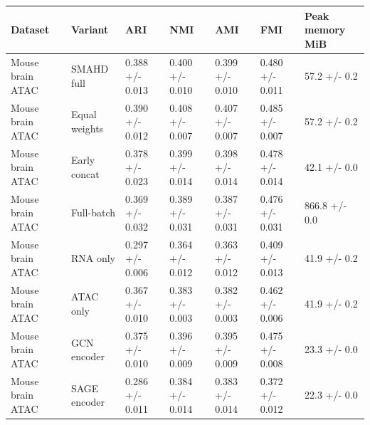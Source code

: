 \begin{tabular}{lllllll}
\toprule
Dataset & Variant & ARI & NMI & AMI & FMI & Peak memory MiB \\
\midrule
Mouse brain ATAC & SMAHD full & 0.388 +/- 0.013 & 0.400 +/- 0.010 & 0.399 +/- 0.010 & 0.480 +/- 0.011 & 57.2 +/- 0.2 \\
Mouse brain ATAC & Equal weights & 0.390 +/- 0.012 & 0.408 +/- 0.007 & 0.407 +/- 0.007 & 0.485 +/- 0.007 & 57.2 +/- 0.2 \\
Mouse brain ATAC & Early concat & 0.378 +/- 0.023 & 0.399 +/- 0.014 & 0.398 +/- 0.014 & 0.478 +/- 0.014 & 42.1 +/- 0.0 \\
Mouse brain ATAC & Full-batch & 0.369 +/- 0.032 & 0.389 +/- 0.031 & 0.387 +/- 0.031 & 0.476 +/- 0.031 & 866.8 +/- 0.0 \\
Mouse brain ATAC & RNA only & 0.297 +/- 0.006 & 0.364 +/- 0.012 & 0.363 +/- 0.012 & 0.409 +/- 0.013 & 41.9 +/- 0.2 \\
Mouse brain ATAC & ATAC only & 0.367 +/- 0.010 & 0.383 +/- 0.003 & 0.382 +/- 0.003 & 0.462 +/- 0.006 & 41.9 +/- 0.2 \\
Mouse brain ATAC & GCN encoder & 0.375 +/- 0.010 & 0.396 +/- 0.009 & 0.395 +/- 0.009 & 0.475 +/- 0.008 & 23.3 +/- 0.0 \\
Mouse brain ATAC & SAGE encoder & 0.286 +/- 0.011 & 0.384 +/- 0.014 & 0.383 +/- 0.014 & 0.372 +/- 0.012 & 22.3 +/- 0.0 \\
\bottomrule
\end{tabular}
